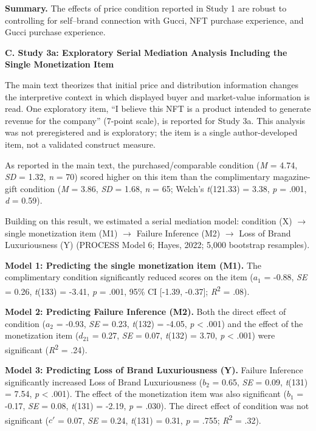\documentclass[12pt, a4paper]{article}
\makeatletter
\newcommand{\SIAnchorHeading}[2]{\clearpage\noindent \hypertarget{#1}{{\large\bfseries #2}}\par\smallskip\@afterindentfalse\@afterheading}
\makeatother
\begin{document}
\noindent \textbf{Summary.} The effects of price condition reported in Study 1 are robust to controlling for self--brand connection with Gucci, NFT purchase experience, and Gucci purchase experience.

\SIAnchorHeading{si:c}{C. Study 3a: Exploratory Serial Mediation Analysis Including the Single Monetization Item}

The main text theorizes that initial price and distribution information changes the interpretive context in which displayed buyer and market-value information is read. One exploratory item, ``I believe this NFT is a product intended to generate revenue for the company'' (7-point scale), is reported for Study 3a. This analysis was not preregistered and is exploratory; the item is a single author-developed item, not a validated construct measure.

As reported in the main text, the purchased/comparable condition (\emph{M} = 4.74, \emph{SD} = 1.32, \emph{n} = 70) scored higher on this item than the complimentary magazine-gift condition (\emph{M} = 3.86, \emph{SD} = 1.68, \emph{n} = 65; Welch's \emph{t}(121.33) = 3.38, \emph{p} = .001, \emph{d} = 0.59).

Building on this result, we estimated a serial mediation model: condition (X) $\rightarrow$ single monetization item (M1) $\rightarrow$ Failure Inference (M2) $\rightarrow$ Loss of Brand Luxuriousness (Y) (PROCESS Model 6; Hayes, 2022; 5,000 bootstrap resamples).

\noindent \textbf{Model 1: Predicting the single monetization item (M1).} The complimentary condition significantly reduced scores on the item ($a_1$ = -0.88, \emph{SE} = 0.26, \emph{t}(133) = -3.41, \emph{p} = .001, 95\% CI {[}-1.39, -0.37{]}; \emph{R}\textsuperscript{2} = .08).

\noindent \textbf{Model 2: Predicting Failure Inference (M2).} Both the direct effect of condition ($a_2$ = -0.93, \emph{SE} = 0.23, \emph{t}(132) = -4.05, \emph{p} \textless{} .001) and the effect of the monetization item ($d_{21}$ = 0.27, \emph{SE} = 0.07, \emph{t}(132) = 3.70, \emph{p} \textless{} .001) were significant (\emph{R}\textsuperscript{2} = .24).

\noindent \textbf{Model 3: Predicting Loss of Brand Luxuriousness (Y).} Failure Inference significantly increased Loss of Brand Luxuriousness ($b_2$ = 0.65, \emph{SE} = 0.09, \emph{t}(131) = 7.54, \emph{p} \textless{} .001). The effect of the monetization item was also significant ($b_1$ = -0.17, \emph{SE} = 0.08, \emph{t}(131) = -2.19, \emph{p} = .030). The direct effect of condition was not significant ($c'$ = 0.07, \emph{SE} = 0.24, \emph{t}(131) = 0.31, \emph{p} = .755; \emph{R}\textsuperscript{2} = .32).
\end{document}
